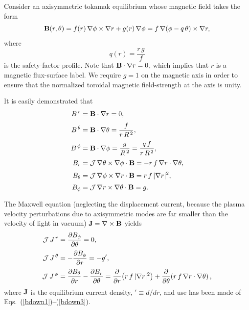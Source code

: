 \documentclass[12pt,prb,aps]{revtex4-1}
\begin{document}
Consider an axisymmetric tokamak equilibrium whose magnetic field takes the form
\begin{equation}
{\bf B}(r,\theta) = f(r)\,\nabla\phi\times \nabla r + g(r)\,\nabla\phi = f\,\nabla(\phi-q\,\theta)\times \nabla r,
\end{equation}
where
\begin{equation}\label{q}
q(r) = \frac{r\,g}{f}
\end{equation}
is the safety-factor profile. Note that ${\bf B}\cdot\nabla r=0$, which implies that $r$ is a magnetic flux-surface label.
We require $g=1$ on the magnetic axis in order to ensure that the normalized toroidal magnetic field-strength at the  axis is unity.  

It is easily demonstrated that\,\cite{tj}
\begin{align}
B^{\,r}&={\bf B}\cdot\nabla r= 0,\label{bup1}\\[0.5ex]
B^{\,\theta} &={\bf B}\cdot\nabla \theta= \frac{f}{r\,R^{\,2}},\label{bup2}\\[0.5ex]
B^{\,\phi} &={\bf B}\cdot\nabla \phi= \frac{g}{R^{\,2}}= \frac{q\,f}{r\,R^{\,2}},\label{bup3}\\[0.5ex]
B_r &={\cal J}\,\nabla\theta\times\nabla\phi\cdot{\bf B}= -r\,f\,\nabla r\cdot\nabla\theta,\label{bdown1}\\[0.5ex]
B_\theta &={\cal J}\,\nabla\phi\times\nabla r\cdot{\bf B}= r\,f\,|\nabla r|^2,\\[0.5ex]
B_\phi &={\cal J}\,\nabla r\times\nabla \theta \cdot{\bf B}= g.\label{bdown3}
\end{align}

The Maxwell equation (neglecting the displacement current, because the plasma velocity perturbations due to axisymmetric modes are far smaller than the velocity of light in vacuum)
${\bf J}= \nabla\times{\bf B}$
yields
\begin{align}
{\cal J}\,J^{\,r} &= \frac{\partial B_\phi}{\partial \theta} =0,\label{jup1}\\[0.5ex]
{\cal J}\,J^{\,\theta} &= -\frac{\partial B_\phi}{\partial r} = - g',\label{jup2}\\[0.5ex]
{\cal J}\,J^{\,\phi}&= \frac{\partial B_\theta}{\partial r} -\frac{\partial B_r}{\partial\theta}=\frac{\partial}{\partial r}\!\left(r\,f\,|\nabla r|^2\right)+ \frac{\partial}{\partial\theta}\!\left(r\,f\,\nabla r\cdot\nabla\theta\right),\label{jup3}
\end{align}
where ${\bf J}$ is the equilibrium current density, $'\equiv d/dr$, and use has been made of  Eqs.~(\ref{bdown1})--(\ref{bdown3}).
\end{document}
